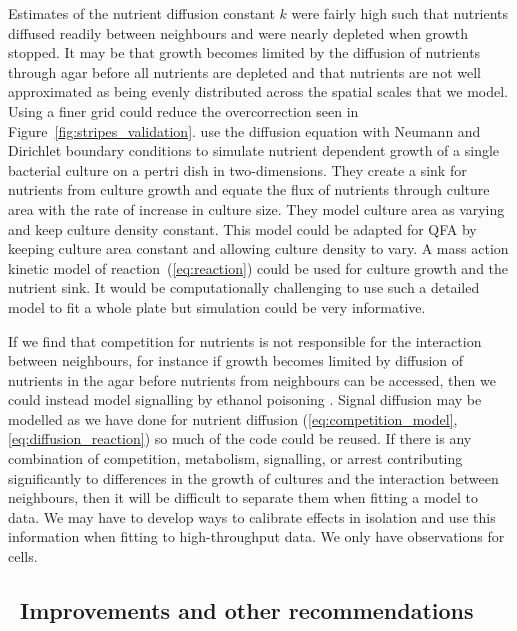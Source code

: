 Estimates of the nutrient diffusion constant \(k\) were fairly
high such that nutrients diffused readily between neighbours and were
nearly depleted when growth stopped. It may be that growth becomes
limited by the diffusion of nutrients through agar before all
nutrients are depleted and that nutrients are not well approximated as
being evenly distributed across the spatial scales that we
model. Using a finer grid could reduce the overcorrection seen in
Figure~\ref{fig:stripes_validation}. \citet{Reo2014} use the diffusion
equation with Neumann and Dirichlet boundary conditions to simulate
nutrient dependent growth of a single bacterial culture on a pertri
dish in two-dimensions. They create a sink for nutrients from culture
growth and equate the flux of nutrients through culture area with the
rate of increase in culture size. They model culture area as varying
and keep culture density constant. This model could be adapted for QFA
by keeping culture area constant and allowing culture density to
vary. A mass action kinetic model of reaction~(\ref{eq:reaction})
could be used for culture growth and the nutrient sink. It would be
computationally challenging to use such a detailed model to fit a
whole plate but simulation could be very informative.

If we find that competition for nutrients is not responsible for the
interaction between neighbours, for instance if growth becomes limited
by diffusion of nutrients in the agar before nutrients from neighbours
can be accessed, then we could instead model signalling by ethanol
poisoning \citep{fujita2006}. Signal diffusion may be modelled as we
have done for nutrient diffusion
(\ref{eq:competition_model},\ref{eq:diffusion_reaction}) so much of
the code could be reused. If there is any combination of competition,
metabolism, signalling, or arrest contributing significantly to
differences in the growth of cultures and the interaction between
neighbours, then it will be difficult to separate them when fitting a
model to data. We may have to develop ways to calibrate effects in
isolation and use this information when fitting to high-throughput
data. We only have observations for cells.

\subsection{\thesubsection~Improvements and other recommendations}

